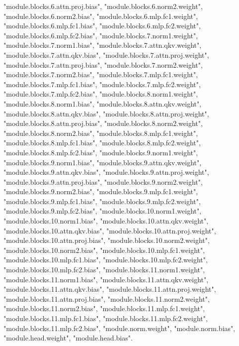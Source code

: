 "module.blocks.6.attn.proj.bias", "module.blocks.6.norm2.weight", "module.blocks.6.norm2.bias", "module.blocks.6.mlp.fc1.weight", "module.blocks.6.mlp.fc1.bias", "module.blocks.6.mlp.fc2.weight", "module.blocks.6.mlp.fc2.bias", "module.blocks.7.norm1.weight", "module.blocks.7.norm1.bias", "module.blocks.7.attn.qkv.weight", "module.blocks.7.attn.qkv.bias", "module.blocks.7.attn.proj.weight", "module.blocks.7.attn.proj.bias", "module.blocks.7.norm2.weight", "module.blocks.7.norm2.bias", "module.blocks.7.mlp.fc1.weight", "module.blocks.7.mlp.fc1.bias", "module.blocks.7.mlp.fc2.weight", "module.blocks.7.mlp.fc2.bias", "module.blocks.8.norm1.weight", "module.blocks.8.norm1.bias", "module.blocks.8.attn.qkv.weight", "module.blocks.8.attn.qkv.bias", "module.blocks.8.attn.proj.weight", "module.blocks.8.attn.proj.bias", "module.blocks.8.norm2.weight", "module.blocks.8.norm2.bias", "module.blocks.8.mlp.fc1.weight", "module.blocks.8.mlp.fc1.bias", "module.blocks.8.mlp.fc2.weight", "module.blocks.8.mlp.fc2.bias", "module.blocks.9.norm1.weight", "module.blocks.9.norm1.bias", "module.blocks.9.attn.qkv.weight", "module.blocks.9.attn.qkv.bias", "module.blocks.9.attn.proj.weight", "module.blocks.9.attn.proj.bias", "module.blocks.9.norm2.weight", "module.blocks.9.norm2.bias", "module.blocks.9.mlp.fc1.weight", "module.blocks.9.mlp.fc1.bias", "module.blocks.9.mlp.fc2.weight", "module.blocks.9.mlp.fc2.bias", "module.blocks.10.norm1.weight", "module.blocks.10.norm1.bias", "module.blocks.10.attn.qkv.weight", "module.blocks.10.attn.qkv.bias", "module.blocks.10.attn.proj.weight", "module.blocks.10.attn.proj.bias", "module.blocks.10.norm2.weight", "module.blocks.10.norm2.bias", "module.blocks.10.mlp.fc1.weight", "module.blocks.10.mlp.fc1.bias", "module.blocks.10.mlp.fc2.weight", "module.blocks.10.mlp.fc2.bias", "module.blocks.11.norm1.weight", "module.blocks.11.norm1.bias", "module.blocks.11.attn.qkv.weight", "module.blocks.11.attn.qkv.bias", "module.blocks.11.attn.proj.weight", "module.blocks.11.attn.proj.bias", "module.blocks.11.norm2.weight", "module.blocks.11.norm2.bias", "module.blocks.11.mlp.fc1.weight", "module.blocks.11.mlp.fc1.bias", "module.blocks.11.mlp.fc2.weight", "module.blocks.11.mlp.fc2.bias", "module.norm.weight", "module.norm.bias", "module.head.weight", "module.head.bias". 

